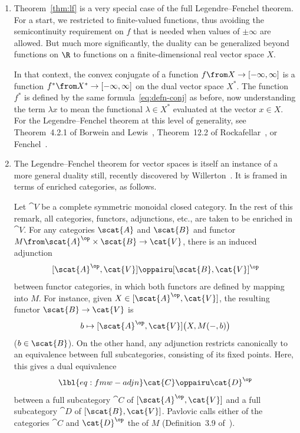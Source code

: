 \begin{remarks}
\begin{enumerate}
\item 
Theorem~\ref{thm:lf} is a very special case of the full Legendre--Fenchel
theorem.  For a start, we restricted to finite-valued functions, thus
avoiding the semicontinuity requirement on $f$ that is needed when
values of $\pm\infty$ are allowed.  But much more significantly, the
duality can be generalized beyond functions on $\R$ to functions on a
finite-dimensional real vector space $X$.

In that context, the convex conjugate of a function $f \from X \to
[-\infty, \infty]$ is a function $f^* \from X^* \to [-\infty, \infty]$ on
the dual vector space $X^*$.  The function $f^*$ is defined by the same
formula~\eqref{eq:defn-conj} as before, now understanding the term $\lambda
x$ to mean the functional $\lambda \in X^*$ evaluated at the vector $x \in
X$.  For the Legendre--Fenchel theorem at this level of generality, see
Theorem~4.2.1 of Borwein and Lewis~\cite{BoLe}, Theorem~12.2 of
Rockafellar~\cite{Rock}, or Fenchel~\cite{Fenc}.

\item
The Legendre--Fenchel theorem for vector spaces is itself an instance of
a more general duality still, recently discovered by
Willerton~\cite{WillLFT}.%
%
% 
It is framed in terms of enriched%
%
% 
categories,%
%
% 
as follows.

Let $\cat{V}$ be a complete symmetric monoidal closed category.  In the
rest of this remark, all categories, functors, adjunctions, etc., are taken
to be enriched in $\cat{V}$.  For any categories $\scat{A}$ and $\scat{B}$
and functor $M \from \scat{A}^\op \times \scat{B} \to \cat{V}$, there
is an induced adjunction
\[
[\scat{A}^\op, \cat{V}]
\oppairu
[\scat{B}, \cat{V}]^\op
\]
between functor categories, in which both functors are defined by mapping
into $M$.  For instance, given $X \in [\scat{A}^\op, \cat{V}]$, the
resulting functor $\scat{B} \to \cat{V}$ is 
\[
b \mapsto [\scat{A}^\op, \cat{V}]\bigl(X, M(-, b)\bigr)
\]
($b \in \scat{B}$).
On the other hand, any adjunction restricts canonically to an equivalence
between full subcategories, consisting of its fixed points.  Here, this
gives a dual equivalence
% 
\begin{equation}
\lbl{eq:fmw-adjn}
\cat{C} \oppairu \cat{D}^\op
\end{equation}
% 
between a full subcategory $\cat{C}$ of $[\scat{A}^\op, \cat{V}]$ and a
full subcategory $\cat{D}$ of $[\scat{B}, \cat{V}]$.  Pavlovic calls
either of the categories $\cat{C}$ and $\cat{D}^\op$ the  of
$M$ (Definition~3.9 of~\cite{Pavl}).%
%
% 


\end{enumerate}
\end{remarks}
